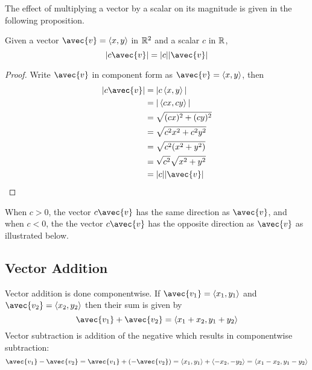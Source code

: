 \documentclass[handout]{ximera}
\begin{document}
The effect of multiplying a vector by a scalar on its magnitude is given in the following proposition.
\begin{proposition}
Given a vector $\avec{v} = \vector{x,y}$ in $\mathbb R^2$ and a scalar $c$ in $\mathbb R$,
\[
|c\avec{v}| = |c| |\avec{v}|
\]
\begin{proof}
Write $\avec{v}$ in component form as $\avec{v} = \vector{x,y}$, then
\begin{align*}
|c\avec{v}| &= |c\vector{x,y}|\\
            &= |\vector{cx,cy}|\\
            &= \sqrt{(cx)^2 + (cy)^2}\\
            &= \sqrt{c^2x^2 + c^2y^2}\\
            &= \sqrt{c^2(x^2 + y^2)}\\
            &= \sqrt{c^2} \sqrt{x^2 + y^2}\\
            &= |c| |\avec{v}|
\end{align*}
\end{proof}
\end{proposition}

When $c>0$, the vector $c\avec{v}$ has the same direction as $\avec{v}$, and when $c<0$, the
the vector $c\avec{v}$ has the opposite direction as $\avec{v}$ as illustrated below.



\begin{image}
\end{image}


\subsection{Vector Addition}
Vector addition is done componentwise.  If $\avec{v_1} = \vector{x_1, y_1}$ and $\avec{v_2} = \vector{x_2, y_2}$
then their sum is given by
\[
\avec{v_1 }+ \avec{ v_2}= \vector{x_1+x_2,  y_1+y_2}
\]
Vector subtraction is addition of the negative which results in componentwise subtraction:
\[
\avec{v_1 }- \avec{ v_2}= \avec{v_1 }+ \left(- \avec{ v_2}\right)  = \vector{x_1,y_1} + \vector{-x_2, -y_2} = \vector{x_1-x_2,  y_1-y_2}
\]
\end{document}
